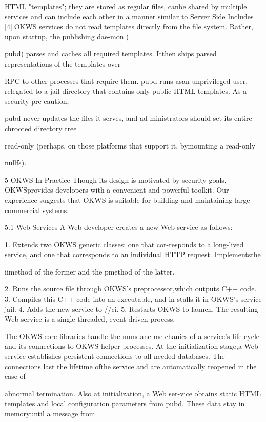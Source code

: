 HTML "templates"; they are stored as regular files, canbe shared by multiple services and can include each other
in a manner similar to Server Side Includes [4].OKWS services do not read templates directly from
the file system. Rather, upon startup, the publishing dae-mon (

pubd) parses and caches all required templates. Itthen ships parsed representations of the templates over

RPC to other processes that require them. pubd runs asan unprivileged user, relegated to a jail directory that contains only public HTML templates. As a security pre-caution,

pubd never updates the files it serves, and ad-ministrators should set its entire chrooted directory tree

read-only (perhaps, on those platforms that support it, bymounting a read-only

nullfs).

5 OKWS In Practice
Though its design is motivated by security goals, OKWSprovides developers with
a convenient and powerful toolkit.
Our experience suggests that OKWS is suitable for building and maintaining large
commercial systems.

5.1 Web Services
A Web developer creates a new Web service as follows:

1. Extends two OKWS generic classes: one that cor-responds to a long-lived service, and one that corresponds to an individual HTTP request. Implementsthe

i\Gamma i\Delta  method of the former and the p\Theta \Lambda \Xi \Pi \Sigma \Sigma method of the latter.

2. Runs the source file through OKWS's preprocessor,which outputs C++ code.
3. Compiles this C++ code into an executable, and in-stalls it in OKWS's service jail.
4. Adds the new service to /\Pi \Delta \Xi /\Lambda \Upsilon \Phi \Sigma  \Xi \Lambda \Gamma ci\Psi .
5. Restarts OKWS to launch.
The resulting Web service is a single-threaded, event-driven process.

The OKWS core libraries handle the mundane me-chanics of a service's life cycle and its connections to
OKWS helper processes. At the initialization stage,a Web service establishes persistent connections to all
needed databases. The connections last the lifetime ofthe service and are automatically reopened in the case of

abnormal termination. Also at initialization, a Web ser-vice obtains static HTML templates and local configuration parameters from pubd. These data stay in memoryuntil a message from

